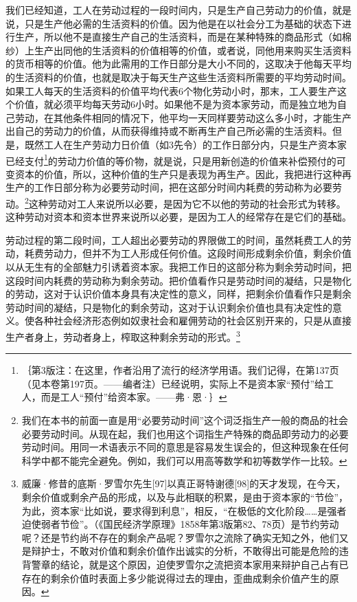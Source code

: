 \documentclass{ctexbook}
\begin{document}
    我们已经知道，工人在劳动过程的一段时间内，只是生产自己劳动力的价值，就是说，只是生产他必需的生活资料的价值。因为他是在以社会分工为基础的状态下进行生产，所以他不是直接生产自己的生活资料，而是在某种特殊的商品形式（如棉纱）上生产出同他的生活资料的价值相等的价值，或者说，同他用来购买生活资料的货币相等的价值。他为此需用的工作日部分是大小不同的，这取决于他每天平均的生活资料的价值，也就是取决于每天生产这些生活资料所需要的平均劳动时间。如果工人每天的生活资料的价值平均代表6个物化劳动小时，那末，工人要生产这个价值，就必须平均每天劳动6小时。如果他不是为资本家劳动，而是独立地为自己劳动，在其他条件相同的情况下，他平均一天同样要劳动这么多小时，才能生产出自己的劳动力的价值，从而获得维持或不断再生产自己所必需的生活资料。但是，既然工人在生产劳动力日价值（如3先令）的工作日部分内，只是生产资本家已经支付\footnote{｛第3版注：在这里，作者沿用了流行的经济学用语。我们记得，在第137页（见本卷第197页。——编者注）已经说明，实际上不是资本家“预付”给工人，而是工人“预付”给资本家。——弗·恩·｝}的劳动力价值的等价物，就是说，只是用新创造的价值来补偿预付的可变资本的价值，所以，这种价值的生产只是表现为再生产。因此，我把进行这种再生产的工作日部分称为必要劳动时间，把在这部分时间内耗费的劳动称为必要劳动。\footnote{我们在本书的前面一直是用“必要劳动时间”这个词泛指生产一般的商品的社会必要劳动时间。从现在起，我们也用这个词指生产特殊的商品即劳动力的必要劳动时间。用同一术语表示不同的意思是容易发生误会的，但这种现象在任何科学中都不能完全避免。例如，我们可以用高等数学和初等数学作一比较。}这种劳动对工人来说所以必要，是因为它不以他的劳动的社会形式为转移。这种劳动对资本和资本世界来说所以必要，是因为工人的经常存在是它们的基础。
    
    劳动过程的第二段时间，工人超出必要劳动的界限做工的时间，虽然耗费工人的劳动，耗费劳动力，但并不为工人形成任何价值。这段时间形成剩余价值，剩余价值以从无生有的全部魅力引诱着资本家。我把工作日的这部分称为剩余劳动时间，把这段时间内耗费的劳动称为剩余劳动。把价值看作只是劳动时间的凝结，只是物化的劳动，这对于认识价值本身具有决定性的意义，同样，把剩余价值看作只是剩余劳动时间的凝结，只是物化的剩余劳动，这对于认识剩余价值也具有决定性的意义。使各种社会经济形态例如奴隶社会和雇佣劳动的社会区别开来的，只是从直接生产者身上，劳动者身上，榨取这种剩余劳动的形式。\footnote{威廉·修昔的底斯·罗雪尔先生[97]以真正哥特谢德[98]的天才发现，在今天，剩余价值或剩余产品的形成，以及与此相联的积累，是由于资本家的“节俭”，为此，资本家“比如说，要求得到利息”，相反，“在极低的文化阶段……是强者迫使弱者节俭”。（《国民经济学原理》1858年第3版第82、78页）是节约劳动呢？还是节约尚不存在的剩余产品呢？罗雪尔之流除了确实无知之外，他们又是辩护士，不敢对价值和剩余价值作出诚实的分析，不敢得出可能是危险的违背警章的结论，就是这个原因，迫使罗雪尔之流把资本家用来辩护自己占有已存在的剩余价值时表面上多少能说得过去的理由，歪曲成剩余价值产生的原因。}
    
\end{document}
